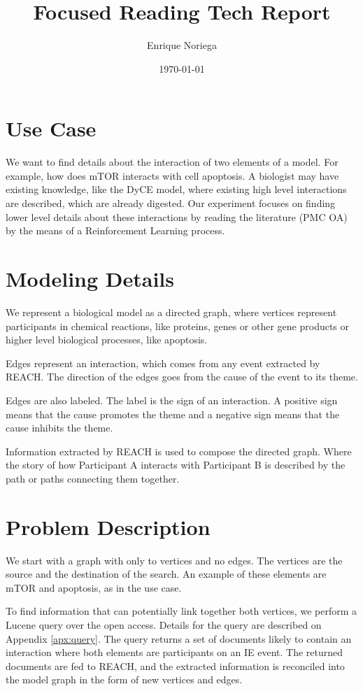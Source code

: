 \documentclass[12pt]{article}
\begin{document}
    \title{Focused Reading Tech Report}
\author{Enrique Noriega}
\date{\today}
\maketitle
\pagebreak

\section{Use Case}
\label{sec:usecase}
We want to find details about the interaction of two elements of a model. For
example, how does mTOR interacts with cell apoptosis. A biologist may have existing knowledge, like the DyCE model, where existing high level interactions are described, which are already digested. Our experiment focuses on finding lower level details about these interactions by reading the literature (PMC OA) by the means of a Reinforcement Learning process.

\section{Modeling Details}
\label{sec:modeling}
We represent a biological model as a directed graph, where vertices represent  participants in chemical reactions, like proteins, genes or other gene products or higher level biological processes, like apoptosis. 

Edges represent an interaction, which comes from any event extracted by REACH. The direction of the edges goes from the cause of the event to its theme.

Edges are also labeled. The label is the sign of an interaction. A positive sign means that the cause promotes the theme and a negative sign means that the cause inhibits the theme.

Information extracted by REACH is used to compose the directed graph. Where the story of how Participant A interacts with Participant B is described by the path or paths connecting them together.

\section{Problem Description}
\label{sec:problemdesc}
We start with a graph with only to vertices and no edges. The vertices are the source and the destination of the search. An example of these elements are mTOR and apoptosis, as in the use case.

To find information that can potentially link together both vertices, we perform a Lucene query over the open access. Details for the query are described on Appendix \ref{apx:query}. The query returns a set of documents likely to contain an interaction where both elements are participants on an IE event. The returned documents are fed to REACH, and the extracted information is reconciled into the model graph in the form of new vertices and edges.
\end{document}
